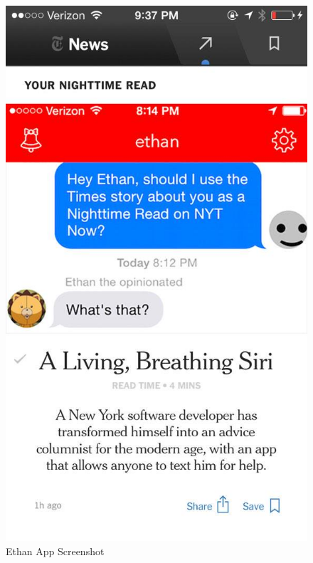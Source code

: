 \documentclass[]{book}
\begin{document}
\begin{figure}
\centering
\includegraphics{images/history/ethanapp.jpeg}
\caption{Ethan App Screenshot}
\end{figure}
\end{document}

